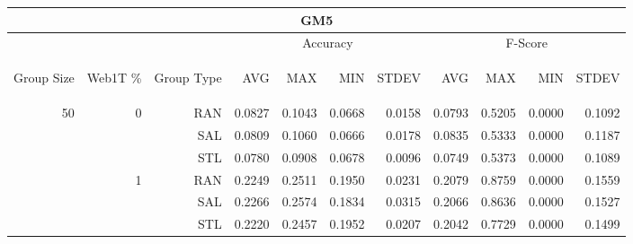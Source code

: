 \begin{center}
\begin{table}[htbp] 
 \begin{center}
\begin{tabular}{ | r | r | r | r | r | r | r | r | r | r | r |}
\hline
\multicolumn{11}{|c|}{GM5}\\
\hline
 & & & \multicolumn{4}{|c|}{Accuracy} & \multicolumn{4}{|c|}{F-Score}\\ \cline{4-11}
\begin{sideways}Group Size\end{sideways} & \begin{sideways}Web1T \%\end{sideways} & \begin{sideways}Group Type\end{sideways} & \begin{sideways}AVG\end{sideways} & \begin{sideways}MAX\end{sideways} & \begin{sideways}MIN\end{sideways} & \begin{sideways}STDEV\end{sideways} & \begin{sideways}AVG\end{sideways} & \begin{sideways}MAX\end{sideways} & \begin{sideways}MIN\end{sideways} & \begin{sideways}STDEV\end{sideways}\\
\hline
\multirow{9}{*}{50}
 & \multirow{3}{*}{0} & RAN & 0.0827 & 0.1043 & 0.0668 & 0.0158 & 0.0793 & 0.5205 & 0.0000 & 0.1092\\ \cline{3-11}
 &   & SAL & 0.0809 & 0.1060 & 0.0666 & 0.0178 & 0.0835 & 0.5333 & 0.0000 & 0.1187\\ \cline{3-11}
 &   & STL & 0.0780 & 0.0908 & 0.0678 & 0.0096 & 0.0749 & 0.5373 & 0.0000 & 0.1089\\ \cline{2-11}
 & \multirow{3}{*}{1} & RAN & 0.2249 & 0.2511 & 0.1950 & 0.0231 & 0.2079 & 0.8759 & 0.0000 & 0.1559\\ \cline{3-11}
 &   & SAL & 0.2266 & 0.2574 & 0.1834 & 0.0315 & 0.2066 & 0.8636 & 0.0000 & 0.1527\\ \cline{3-11}
 &   & STL & 0.2220 & 0.2457 & 0.1952 & 0.0207 & 0.2042 & 0.7729 & 0.0000 & 0.1499\\ \cline{2-11}

\end{tabular}
\end{center}
\end{table}
\end{center}

